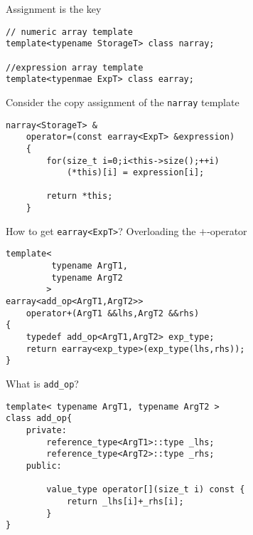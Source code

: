 \documentclass{beamer}
\begin{document}
\begin{frame}[fragile]{Assignment is the key}
    \begin{verbatim}
// numeric array template
template<typename StorageT> class narray; 

//expression array template
template<typenmae ExpT> class earray;
    \end{verbatim} 
    \vspace{0.05\textheight}
    Consider the copy assignment of the \texttt{narray} template
    \begin{verbatim}
narray<StorageT> &
    operator=(const earray<ExpT> &expression)
    {
        for(size_t i=0;i<this->size();++i)
            (*this)[i] = expression[i];

        return *this;
    }
    \end{verbatim}
\end{frame}

\begin{frame}[fragile]{How to get \texttt{earray<ExpT>}?}
    Overloading the $+$-operator 
    \vspace{0.05\textheight}
    \begin{verbatim}
template<
         typename ArgT1,
         typename ArgT2
        >
earray<add_op<ArgT1,ArgT2>> 
    operator+(ArgT1 &&lhs,ArgT2 &&rhs)
{
    typedef add_op<ArgT1,ArgT2> exp_type;
    return earray<exp_type>(exp_type(lhs,rhs));
}
    \end{verbatim}
\end{frame}

\begin{frame}[fragile]{What is \texttt{add\_op}?}
    \begin{verbatim}
template< typename ArgT1, typename ArgT2 >
class add_op{
    private:
        reference_type<ArgT1>::type _lhs;
        reference_type<ArgT2>::type _rhs;
    public:

        value_type operator[](size_t i) const {
            return _lhs[i]+_rhs[i];
        }
}
    \end{verbatim}
\end{frame}
\end{document}
